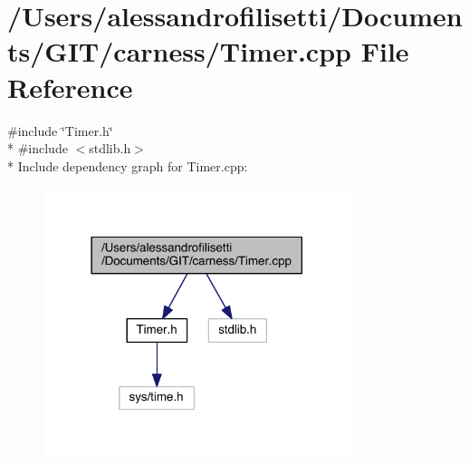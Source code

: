\hypertarget{a00122}{\section{/\+Users/alessandrofilisetti/\+Documents/\+G\+I\+T/carness/\+Timer.cpp File Reference}
\label{a00122}
}
{\ttfamily \#include \char`\"{}Timer.\+h\char`\"{}}\\*
{\ttfamily \#include $<$stdlib.\+h$>$}\\*
Include dependency graph for Timer.\+cpp\+:\nopagebreak
\begin{figure}[H]
\begin{center}
\leavevmode
\includegraphics[width=254pt]{a00208}
\end{center}
\end{figure}
